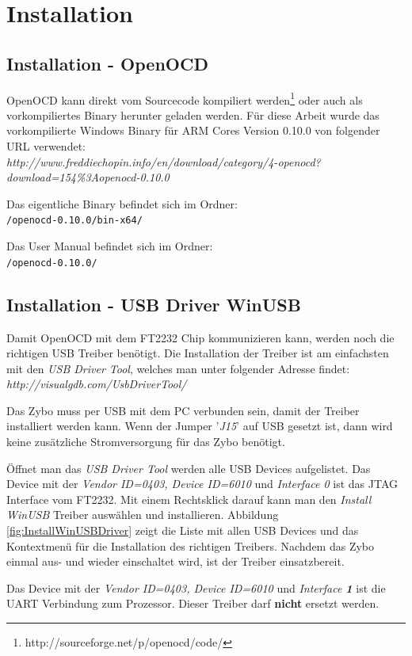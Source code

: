 \section{Installation}
\subsection{Installation - OpenOCD}
OpenOCD kann direkt vom Sourcecode kompiliert werden\footnote{http://sourceforge.net/p/openocd/code/} oder auch als vorkompiliertes Binary herunter geladen werden.
Für diese Arbeit wurde das vorkompilierte Windows Binary für ARM Cores Version 0.10.0 von folgender URL verwendet:\\
\textit{http://www.freddiechopin.info/en/download/category/4-openocd?download=154\%3Aopenocd-0.10.0}

Das eigentliche Binary befindet sich im Ordner:\\
\texttt{/openocd-0.10.0/bin-x64/} 

Das User Manual befindet sich im Ordner:\\
\texttt{/openocd-0.10.0/} 


\subsection{Installation - USB Driver WinUSB}
Damit OpenOCD mit dem FT2232 Chip kommunizieren kann, werden noch die richtigen USB Treiber benötigt.
Die Installation der Treiber ist am einfachsten mit den \textit{USB Driver Tool}, welches man unter folgender Adresse findet:\\
\textit{http://visualgdb.com/UsbDriverTool/}

Das Zybo muss per USB mit dem PC verbunden sein, damit der Treiber installiert werden kann.
Wenn der Jumper '\textit{J15}' auf USB gesetzt ist, dann wird keine zusätzliche Stromversorgung für das Zybo benötigt.

Öffnet man das \textit{USB Driver Tool} werden alle USB Devices aufgelistet.
Das Device mit der \textit{Vendor ID=0403, Device ID=6010} und \textit{Interface 0} ist das JTAG Interface vom FT2232.
Mit einem Rechtsklick darauf kann man den \textit{Install WinUSB} Treiber auswählen und installieren.
Abbildung \ref{fig:InstallWinUSBDriver} zeigt die Liste mit allen USB Devices und das Kontextmenü für die Installation des richtigen Treibers.
Nachdem das Zybo einmal aus- und wieder einschaltet wird, ist der Treiber einsatzbereit.

Das Device mit der \textit{Vendor ID=0403, Device ID=6010} und \textit{Interface \textbf{1}} ist die UART Verbindung zum Prozessor.
Dieser Treiber darf \textbf{nicht} ersetzt werden.

